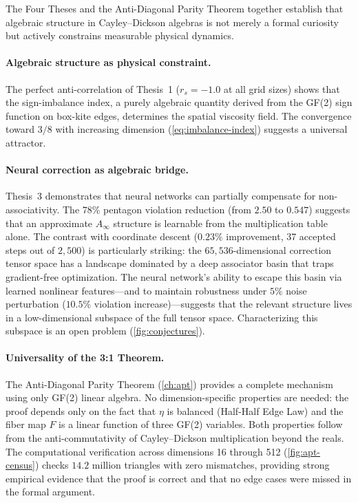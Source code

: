 \documentclass[12pt,openany]{report}
\theoremstyle{definition}
\theoremstyle{plain}
\theoremstyle{remark}
\begin{document}
The Four Theses and the Anti-Diagonal Parity Theorem together establish
that algebraic structure in Cayley--Dickson algebras is not merely a formal
curiosity but actively constrains measurable physical dynamics.

\paragraph{Algebraic structure as physical constraint.}
The perfect anti-correlation of Thesis~1 ($r_s = -1.0$ at all grid sizes)
shows that the sign-imbalance index, a purely algebraic quantity derived from
the GF(2) sign function on box-kite edges, determines the spatial viscosity
field.  The convergence toward $3/8$ with increasing dimension
(\cref{eq:imbalance-index}) suggests a universal attractor.

\paragraph{Neural correction as algebraic bridge.}
Thesis~3 demonstrates that neural networks can partially compensate for
non-associativity.  The 78\% pentagon violation reduction (from $2.50$ to
$0.547$) suggests that an approximate $A_\infty$ structure is learnable
from the multiplication table alone.  The contrast with coordinate
descent ($0.23\%$ improvement, 37 accepted steps out of $2{,}500$) is
particularly striking: the $65{,}536$-dimensional correction tensor space
has a landscape dominated by a deep associator basin that traps
gradient-free optimization.  The neural network's ability to escape this
basin via learned nonlinear features---and to maintain robustness under
$5\%$ noise perturbation ($10.5\%$ violation increase)---suggests that
the relevant structure lives in a low-dimensional subspace of the full
tensor space.  Characterizing this subspace is an open problem
(\cref{fig:conjectures}).

\paragraph{Universality of the 3:1 Theorem.}
The Anti-Diagonal Parity Theorem (\cref{ch:apt}) provides a complete
mechanism using only GF(2) linear algebra.  No dimension-specific
properties are needed: the proof depends only on the fact that $\eta$ is
balanced (Half-Half Edge Law) and the fiber map $F$ is a linear function
of three GF(2) variables.  Both properties follow from the
anti-commutativity of Cayley--Dickson multiplication beyond the reals.
The computational verification across dimensions 16 through 512
(\cref{fig:apt-census}) checks $14.2$ million triangles with zero
mismatches, providing strong empirical evidence that the proof is
correct and that no edge cases were missed in the formal argument.
\end{document}
